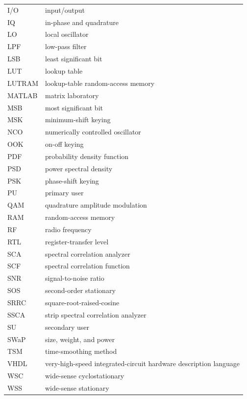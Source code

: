 \begin{longtable}{@{}L{0.23\textwidth}L{0.68\textwidth}@{}}
I/O & input/output \\
IQ & in-phase and quadrature \\
LO & local oscillator \\
LPF & low-pass filter \\
LSB & least significant bit \\
LUT & lookup table \\
LUTRAM & lookup-table random-access memory \\
MATLAB & matrix laboratory \\
MSB & most significant bit \\
MSK & minimum-shift keying \\
NCO & numerically controlled oscillator \\
OOK & on-off keying \\
PDF & probability density function \\
PSD & power spectral density \\
PSK & phase-shift keying \\
PU & primary user \\
QAM & quadrature amplitude modulation \\
RAM & random-access memory \\
RF & radio frequency \\
RTL & register-transfer level \\
SCA & spectral correlation analyzer \\
SCF & spectral correlation function \\
SNR & signal-to-noise ratio \\
SOS & second-order stationary \\
SRRC & square-root-raised-cosine \\
SSCA & strip spectral correlation analyzer \\
SU & secondary user \\
SWaP & size, weight, and power \\
TSM & time-smoothing method \\
VHDL & very-high-speed integrated-circuit hardware description language \\
WSC & wide-sense cyclostationary \\
WSS & wide-sense stationary \\
\end{longtable}
\endgroup

